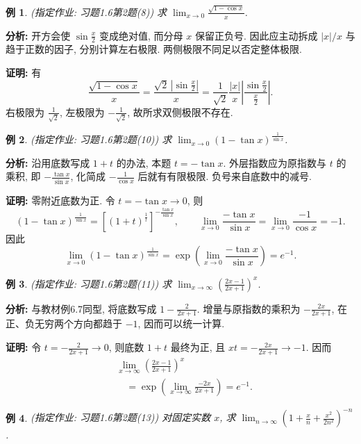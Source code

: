\documentclass[UTF8,openany]{ctexbook}
\theoremstyle{chinesetextbook}
\newtheorem{example}{例}[section]
\newenvironment{cnproof}{\par\indent\textbf{证明:} \ignorespaces}{\par}
\begin{document}
\begin{example}
(指定作业: 习题1.6第2题(8)) 求 $\displaystyle \lim_{x\to0}\frac{\sqrt{1-\cos x}}x$.
\end{example}
\par\indent\textbf{分析:} 开方会使 $\displaystyle\sin\frac x2$ 变成绝对值, 而分母 $x$ 保留正负号. 因此应主动拆成 $|x|/x$ 与趋于正数的因子, 分别计算左右极限. 两侧极限不同足以否定整体极限.
\begin{cnproof}
有
\[
\frac{\sqrt{1-\cos x}}x
=\frac{\sqrt2\,|\sin\frac x2|}{x}
=\frac1{\sqrt2}\frac{|x|}{x}\left|\frac{\sin\frac x2}{\frac x2}\right|.
\]
右极限为 $\displaystyle \frac1{\sqrt2}$, 左极限为 $\displaystyle -\frac1{\sqrt2}$, 故所求双侧极限不存在.
\end{cnproof}
\begin{example}
(指定作业: 习题1.6第2题(10)) 求 $\displaystyle \lim_{x\to0}(1-\tan x)^{\frac1{\sin x}}$.
\end{example}
\par\indent\textbf{分析:} 沿用底数写成 $1+t$ 的办法, 本题 $t=-\tan x$. 外层指数应为原指数与 $t$ 的乘积, 即 $\displaystyle-\frac{\tan x}{\sin x}$, 化简成 $\displaystyle-\frac1{\cos x}$ 后就有有限极限. 负号来自底数中的减号.
\begin{cnproof}
零附近底数为正. 令 $t=-\tan x\to0$, 则
\[
(1-\tan x)^{\frac1{\sin x}}
=\left[(1+t)^{\frac1t}\right]^{-\frac{\tan x}{\sin x}},
\qquad \lim_{x\to0}\frac{-\tan x}{\sin x}=\lim_{x\to0}\frac{-1}{\cos x}=-1.
\]
因此
\[
\lim_{x\to0}(1-\tan x)^{\frac1{\sin x}}
=\exp\left(\lim_{x\to0}\frac{-\tan x}{\sin x}\right)=e^{-1}.
\]
\end{cnproof}
\begin{example}
(指定作业: 习题1.6第2题(11)) 求 $\displaystyle \lim_{x\to\infty}(\frac{2x-1}{2x+1})^x$.
\end{example}
\par\indent\textbf{分析:} 与教材例6.7同型, 将底数写成 $\displaystyle1-\frac2{2x+1}$. 增量与原指数的乘积为 $\displaystyle-\frac{2x}{2x+1}$, 在正、负无穷两个方向都趋于 $-1$, 因而可以统一计算.
\begin{cnproof}
令 $\displaystyle t=-\frac2{2x+1}\to0$, 则底数 $1+t$ 最终为正, 且 $\displaystyle xt=-\frac{2x}{2x+1}\to-1$. 因而
\[
\begin{aligned}
&\lim_{x\to\infty}\left(\frac{2x-1}{2x+1}\right)^x\\
&\quad=\exp\left(\lim_{x\to\infty}\frac{-2x}{2x+1}\right)=e^{-1}.
\end{aligned}
\]
\end{cnproof}
\begin{example}
(指定作业: 习题1.6第2题(13)) 对固定实数 $x$, 求 $\displaystyle \lim_{n\to\infty}(1+\frac xn+\frac{x^2}{2n^2})^{-n}$.
\end{example}
\end{document}
